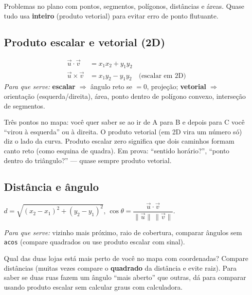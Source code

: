 Problemas no plano com pontos, segmentos, polígonos, distâncias e áreas.
Quase tudo usa \textbf{inteiro} (produto vetorial) para evitar erro de ponto flutuante.

\subsection{Produto escalar e vetorial (2D)}

\begin{align}
  \vec{u}\cdot\vec{v} &= x_1 x_2 + y_1 y_2 \\
  \vec{u}\times\vec{v} &= x_1 y_2 - y_1 y_2 \quad \text{(escalar em 2D)}
\end{align}
\emph{Para que serve:} \textbf{escalar} $\Rightarrow$ ângulo reto se $=0$, projeção; \textbf{vetorial} $\Rightarrow$ orientação (esquerda/direita), área, ponto dentro de polígono convexo, interseção de segmentos.

\begin{exemplodiabox}
Três pontos no mapa: você quer saber se ao ir de A para B e depois para C você ``virou à esquerda'' ou à direita. O produto vetorial (em 2D vira um número só) diz o lado da curva. Produto escalar zero significa que dois caminhos formam canto reto (como esquina de quadra). Em prova: ``sentido horário?'', ``ponto dentro do triângulo?'' --- quase sempre produto vetorial.
\end{exemplodiabox}



\subsection{Distância e ângulo}

$d = \sqrt{(x_2-x_1)^2 + (y_2-y_1)^2}$, \quad $\cos\theta = \dfrac{\vec{u}\cdot\vec{v}}{\|\vec{u}\|\,\|\vec{v}\|}$.

\emph{Para que serve:} vizinho mais próximo, raio de cobertura, comparar ângulos sem \texttt{acos} (compare quadrados ou use produto escalar com sinal).

\begin{exemplodiabox}
Qual das duas lojas está mais perto de você no mapa com coordenadas? Compare distâncias (muitas vezes compare o \textbf{quadrado} da distância e evite raiz). Para saber se duas ruas fazem um ângulo ``mais aberto'' que outras, dá para comparar usando produto escalar sem calcular graus com calculadora.
\end{exemplodiabox}


